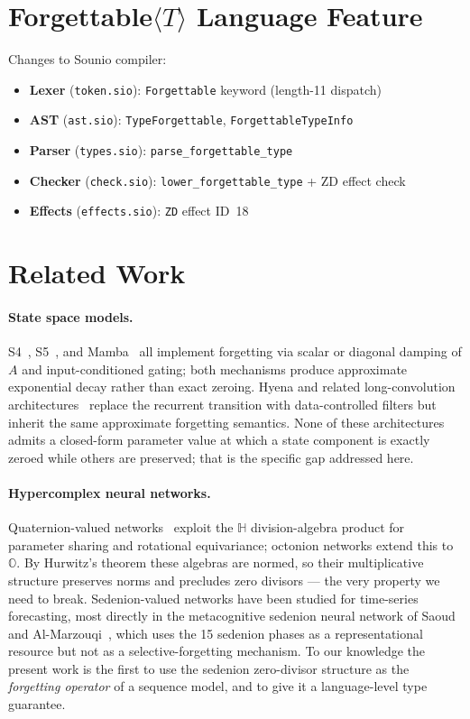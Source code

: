 \documentclass{article}
\begin{document}
\section{Forgettable$\langle T\rangle$ Language Feature}

Changes to Sounio compiler:
\begin{itemize}
  \item \textbf{Lexer} (\texttt{token.sio}): \texttt{Forgettable} keyword (length-11 dispatch)
  \item \textbf{AST} (\texttt{ast.sio}): \texttt{TypeForgettable}, \texttt{ForgettableTypeInfo}
  \item \textbf{Parser} (\texttt{types.sio}): \texttt{parse\_forgettable\_type}
  \item \textbf{Checker} (\texttt{check.sio}): \texttt{lower\_forgettable\_type} + ZD effect check
  \item \textbf{Effects} (\texttt{effects.sio}): \texttt{ZD} effect ID~18
\end{itemize}

\section{Related Work}

\paragraph{State space models.}
S4~\cite{gu2021efficiently}, S5~\cite{smith2022simplified}, and
Mamba~\cite{gu2023mamba} all implement forgetting via scalar or diagonal
damping of $A$ and input-conditioned gating; both mechanisms produce
approximate exponential decay rather than exact zeroing. Hyena and related
long-convolution architectures~\cite{poli2023hyena} replace the recurrent
transition with data-controlled filters but inherit the same approximate
forgetting semantics. None of these architectures admits a closed-form
parameter value at which a state component is exactly zeroed while others
are preserved; that is the specific gap addressed here.

\paragraph{Hypercomplex neural networks.}
Quaternion-valued networks~\cite{parcollet2019quaternion} exploit the
$\mathbb{H}$ division-algebra product for parameter sharing and rotational
equivariance; octonion networks extend this to $\mathbb{O}$. By Hurwitz's
theorem these algebras are normed, so their multiplicative structure
preserves norms and precludes zero divisors --- the very property we need to
break. Sedenion-valued networks have been studied for time-series
forecasting, most directly in the metacognitive sedenion neural network of
Saoud and Al-Marzouqi~\cite{saoud2020sedenion}, which uses the 15 sedenion
phases as a representational resource but not as a selective-forgetting
mechanism. To our knowledge the present work is the first to use the
sedenion zero-divisor structure as the \emph{forgetting operator} of a
sequence model, and to give it a language-level type guarantee.
\end{document}
